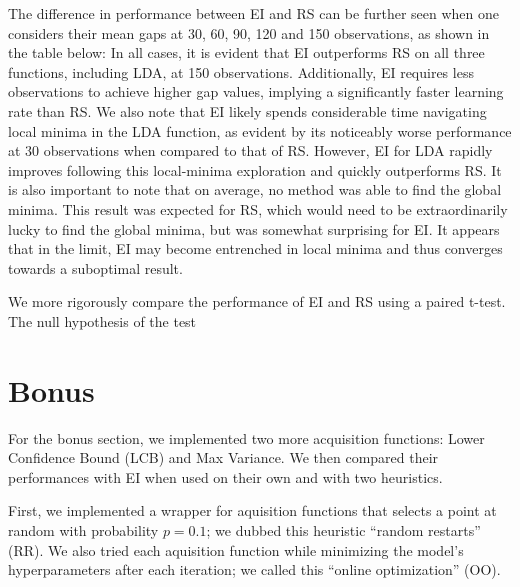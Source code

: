 \documentclass[11pt]{article}
\numberwithin{equation}{section}
\begin{document}
The difference in performance between EI and RS can be further seen when one considers their mean gaps at 30, 60, 90, 120 and 150 observations, 
as shown in the table below:
In all cases, it is evident that EI outperforms RS on all three functions, including LDA, at 150 observations. 
Additionally, EI requires less observations to achieve higher gap values, implying a significantly faster learning rate than RS.
We also note that EI likely spends considerable time navigating local minima in the LDA function, 
as evident by its noticeably worse performance at 30 observations when compared to that of RS. 
However, EI for LDA rapidly improves following this local-minima exploration and quickly outperforms RS. 
It is also important to note that on average, no method was able to find the global minima. 
This result was expected for RS, which would need to be extraordinarily lucky to find the global minima, but was somewhat surprising for EI.
It appears that in the limit, EI may become entrenched in local minima and thus converges towards a suboptimal result. 

We more rigorously compare the performance of EI and RS using a paired t-test. The null hypothesis of the test 


\section*{Bonus}
For the bonus section, we implemented two more acquisition functions: Lower
Confidence Bound (LCB) and Max Variance. We then compared their performances
with EI when used on their own and with two heuristics.

First, we implemented a wrapper for aquisition functions that selects a point
at random with probability $p = 0.1$; we dubbed this heuristic ``random
restarts'' (RR). We also tried each aquisition function while minimizing the
model's hyperparameters after each iteration; we called this ``online
optimization'' (OO). 
\end{document}
